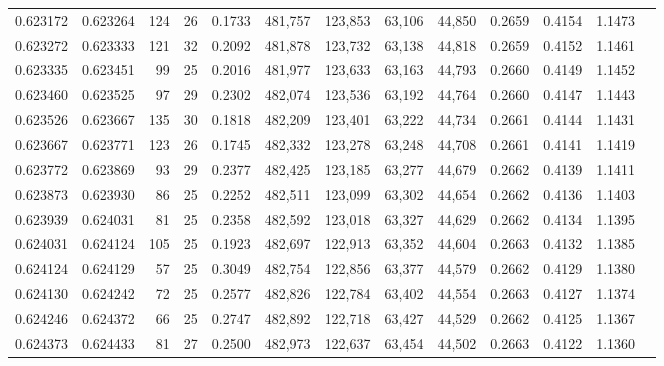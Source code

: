 \begin{tabular}{rrrrrrrrrrrrr}
0.623172 & 0.623264 &   124 &  26 &                                     0.1733 & 481,757 & 123,853 &  63,106 &  44,850 & 0.2659 & 0.4154 & 1.1473 \\
0.623272 & 0.623333 &   121 &  32 &                                     0.2092 & 481,878 & 123,732 &  63,138 &  44,818 & 0.2659 & 0.4152 & 1.1461 \\
0.623335 & 0.623451 &    99 &  25 &                                     0.2016 & 481,977 & 123,633 &  63,163 &  44,793 & 0.2660 & 0.4149 & 1.1452 \\
0.623460 & 0.623525 &    97 &  29 &                                     0.2302 & 482,074 & 123,536 &  63,192 &  44,764 & 0.2660 & 0.4147 & 1.1443 \\
0.623526 & 0.623667 &   135 &  30 &                                     0.1818 & 482,209 & 123,401 &  63,222 &  44,734 & 0.2661 & 0.4144 & 1.1431 \\
0.623667 & 0.623771 &   123 &  26 &                                     0.1745 & 482,332 & 123,278 &  63,248 &  44,708 & 0.2661 & 0.4141 & 1.1419 \\
0.623772 & 0.623869 &    93 &  29 &                                     0.2377 & 482,425 & 123,185 &  63,277 &  44,679 & 0.2662 & 0.4139 & 1.1411 \\
0.623873 & 0.623930 &    86 &  25 &                                     0.2252 & 482,511 & 123,099 &  63,302 &  44,654 & 0.2662 & 0.4136 & 1.1403 \\
0.623939 & 0.624031 &    81 &  25 &                                     0.2358 & 482,592 & 123,018 &  63,327 &  44,629 & 0.2662 & 0.4134 & 1.1395 \\
0.624031 & 0.624124 &   105 &  25 &                                     0.1923 & 482,697 & 122,913 &  63,352 &  44,604 & 0.2663 & 0.4132 & 1.1385 \\
0.624124 & 0.624129 &    57 &  25 &                                     0.3049 & 482,754 & 122,856 &  63,377 &  44,579 & 0.2662 & 0.4129 & 1.1380 \\
0.624130 & 0.624242 &    72 &  25 &                                     0.2577 & 482,826 & 122,784 &  63,402 &  44,554 & 0.2663 & 0.4127 & 1.1374 \\
0.624246 & 0.624372 &    66 &  25 &                                     0.2747 & 482,892 & 122,718 &  63,427 &  44,529 & 0.2662 & 0.4125 & 1.1367 \\
0.624373 & 0.624433 &    81 &  27 &                                     0.2500 & 482,973 & 122,637 &  63,454 &  44,502 & 0.2663 & 0.4122 & 1.1360 \\

\end{tabular}
